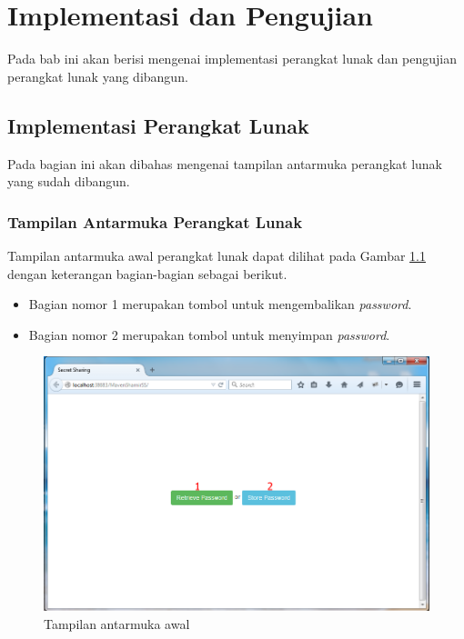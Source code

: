 \chapter{Implementasi dan Pengujian}
\label{chap:Implementasi dan Pengujian}

Pada bab ini akan berisi mengenai implementasi perangkat lunak dan pengujian perangkat lunak yang dibangun.

\section{Implementasi Perangkat Lunak}

Pada bagian ini akan dibahas mengenai tampilan antarmuka perangkat lunak yang sudah dibangun.

\subsection{Tampilan Antarmuka Perangkat Lunak}

Tampilan antarmuka awal perangkat lunak dapat dilihat pada Gambar \ref{fig:tampilan1} dengan keterangan bagian-bagian sebagai berikut.

\begin{itemize}
	\item Bagian nomor 1 merupakan tombol untuk mengembalikan \textit{password}.
	\item Bagian nomor 2 merupakan tombol untuk menyimpan \textit{password}.
\end{itemize}

\begin{figure}[H]
	\centerline{\includegraphics[scale=0.5]{Gambar/tampilan1}}
	\caption{Tampilan antarmuka awal}\label{fig:tampilan1}
\end{figure}

